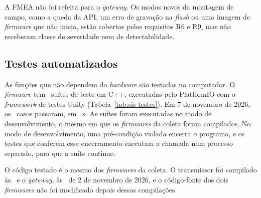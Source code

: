 A FMEA não foi refeita para o \textit{gateway}. Os modos novos da montagem de campo, como a queda da API, um erro de gravação na \textit{flash} ou uma imagem de \textit{firmware} que não inicia, estão cobertos pelos requisitos R6 e R9, mas não receberam classe de severidade nem de detectabilidade.

\subsection{Testes automatizados}\label{sec:sis-testes}

As funções que não dependem do \textit{hardware} são testadas no computador. O \textit{firmware} tem \sisTestesSuites\ suítes de teste em C++, executadas pelo PlatformIO com o \textit{framework} de testes Unity (Tabela~\ref{tab:sis-testes}). Em 7 de novembro de 2026, os \sisTestesCasos\ casos passaram, em \sisTestesDuracao~s. As suítes foram executadas no modo de desenvolvimento, o mesmo em que os \textit{firmwares} da coleta foram compilados. No modo de desenvolvimento, uma pré-condição violada encerra o programa, e os testes que conferem esse encerramento executam a chamada num processo separado, para que a suíte continue.

O código testado é o mesmo dos \textit{firmwares} da coleta. O transmissor foi compilado às \sisCompilaTransmissor\ e o \textit{gateway}, às \sisCompilaGateway\ de 2 de novembro de 2026, e o código-fonte dos dois \textit{firmwares} não foi modificado depois dessas compilações.

